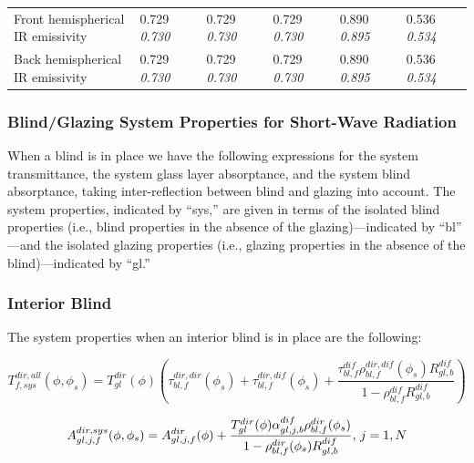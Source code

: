 \begin{longtable}[c]{p{1.0in}p{0.4in}p{0.4in}p{0.4in}p{0.4in}p{0.4in}p{0.4in}p{0.4in}p{0.4in}p{0.4in}p{0.4in}}
Front hemispherical IR emissivity & 0.729 \quad \quad \textit{0.730} &  & 0.729 \quad \quad \textit{0.730} &  & 0.729 \quad \quad \textit{0.730} &  & 0.890 \quad \quad \textit{0.895} &  & 0.536 \quad \quad \textit{0.534} &  \tabularnewline
Back hemispherical IR emissivity & 0.729 \quad \quad \textit{0.730} &  & 0.729 \quad \quad \textit{0.730} &  & 0.729 \quad \quad \textit{0.730} &  & 0.890 \quad \quad \textit{0.895} &  & 0.536 \quad \quad \textit{0.534} &  \tabularnewline
\bottomrule
\end{longtable}

\subsubsection{Blind/Glazing System Properties for Short-Wave Radiation}\label{blindglazing-system-properties-for-short-wave-radiation}

When a blind is in place we have the following expressions for the system transmittance, the system glass layer absorptance, and the system blind absorptance, taking inter-reflection between blind and glazing into account. The system properties, indicated by ``sys,'' are given in terms of the isolated blind properties (i.e., blind properties in the absence of the glazing)---indicated by ``bl'' ---and the isolated glazing properties (i.e., glazing properties in the absence of the blind)---indicated by ``gl.''

\subsubsection{Interior Blind}\label{interior-blind}

The system properties when an interior blind is in place are the following:

\begin{equation}
T_{f,sys}^{dir,all}(\phi ,{\phi_s}) = T_{gl}^{dir}(\phi )\left( {\tau_{bl,f}^{dir,dir}({\phi_s}) + \tau_{bl,f}^{dir,dif}({\phi_s}) + \frac{{\tau_{bl,f}^{dif}\rho_{bl,f}^{dir,dif}({\phi_s})R_{gl,b}^{dif}}}{{1 - \rho_{bl,f}^{dif}R_{gl,b}^{dif}}}} \right)
\end{equation}

\begin{equation}
A_{gl,j,f}^{dir,sys}(\phi ,{\phi_s}) = A_{gl,j,f}^{dir}(\phi ) + \frac{{T_{gl}^{dir}(\phi )\alpha_{gl,j,b}^{dif}\rho_{bl,f}^{dir}({\phi_s})}}{{1 - \rho_{bl,f}^{dir}({\phi_s})R_{gl,b}^{dif}}}{\rm{,    }}~j = 1,N
\end{equation}

